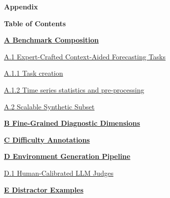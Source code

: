 \documentclass[]{servicenow}
\begin{document}
\clearpage




\clearpage


\appendix

\textbf{\huge Appendix}
\vspace{5pt}

\textbf{Table of Contents}\\
\noindent\makebox[\textwidth]{\rule{\textwidth}{0.4pt}}

\textbf{\hyperref[app:benchmark-composition]{A Benchmark Composition}}
\dotfill \hyperref[app:benchmark-composition]{\pageref{app:benchmark-composition}}

\hspace{0.5cm}\hyperref[app:expert-motivation]{A.1 Expert-Crafted Context-Aided Forecasting Tasks}
\dotfill \hyperref[app:expert-motivation]{\pageref{app:expert-motivation}}

\hspace{1.0cm}\hyperref[app:expert-task-creation]{A.1.1 Task creation}
\dotfill \hyperref[app:expert-task-creation]{\pageref{app:expert-task-creation}}

\hspace{1.0cm}\hyperref[app:expert-ts-stats]{A.1.2 Time series statistics and pre-processing}
\dotfill \hyperref[app:expert-ts-stats]{\pageref{app:expert-ts-stats}}

\hspace{0.5cm}\hyperref[app:scalable-subset]{A.2 Scalable Synthetic Subset}
\dotfill \hyperref[app:scalable-subset]{\pageref{app:scalable-subset}}

\textbf{\hyperref[appendix:difficulty]{B Fine-Grained Diagnostic Dimensions}}
\dotfill \hyperref[appendix:difficulty]{\pageref{appendix:difficulty}}

\textbf{\hyperref[appx:difficulty_annotations]{C Difficulty Annotations}}
\dotfill \hyperref[appx:difficulty_annotations]{\pageref{appx:difficulty_annotations}}

\textbf{\hyperref[app:env-gen-pipeline]{D Environment Generation Pipeline}}
\dotfill \hyperref[app:env-gen-pipeline]{\pageref{app:env-gen-pipeline}}

\hspace{0.5cm}\hyperref[appx:judge_details]{D.1 Human-Calibrated LLM Judges}
\dotfill \hyperref[appx:judge_details]{\pageref{appx:judge_details}}

\textbf{\hyperref[appx:distractor]{E Distractor Examples}}
\dotfill \hyperref[appx:distractor]{\pageref{appx:distractor}}
\end{document}
